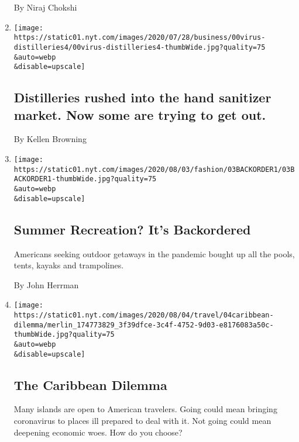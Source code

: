 \begin{enumerate}
  By Niraj Chokshi
\item
  \href{/2020/08/04/business/distilleries-rushed-into-the-hand-sanitizer-market-now-some-are-trying-to-get-out.html}{}

  \texttt{[image: https://static01.nyt.com/images/2020/07/28/business/00virus-distilleries4/00virus-distilleries4-thumbWide.jpg?quality=75\\\&auto=webp\\\&disable=upscale]}

  \hypertarget{distilleries-rushed-into-the-hand-sanitizer-market-now-some-are-trying-to-get-out}{%
  \subsection{Distilleries rushed into the hand sanitizer market. Now
  some are trying to get
  out.}\label{distilleries-rushed-into-the-hand-sanitizer-market-now-some-are-trying-to-get-out}}

  By Kellen Browning
\item
  \href{/2020/08/04/style/outdoor-camping-gear-pools-backordered.html}{}

  \texttt{[image: https://static01.nyt.com/images/2020/08/03/fashion/03BACKORDER1/03BACKORDER1-thumbWide.jpg?quality=75\\\&auto=webp\\\&disable=upscale]}

  \hypertarget{summer-recreation-its-backordered}{%
  \subsection{Summer Recreation? It's
  Backordered}\label{summer-recreation-its-backordered}}

  Americans seeking outdoor getaways in the pandemic bought up all the
  pools, tents, kayaks and trampolines.

  By John Herrman
\item
  \href{/2020/08/04/travel/coronavirus-caribbean-vacations.html}{}

  \texttt{[image: https://static01.nyt.com/images/2020/08/04/travel/04caribbean-dilemma/merlin\_174773829\_3f39dfce-3c4f-4752-9d03-e8176083a50c-thumbWide.jpg?quality=75\\\&auto=webp\\\&disable=upscale]}

  \hypertarget{the-caribbean-dilemma}{%
  \subsection{The Caribbean Dilemma}\label{the-caribbean-dilemma}}

  Many islands are open to American travelers. Going could mean bringing
  coronavirus to places ill prepared to deal with it. Not going could
  mean deepening economic woes. How do you choose?


\end{enumerate}
